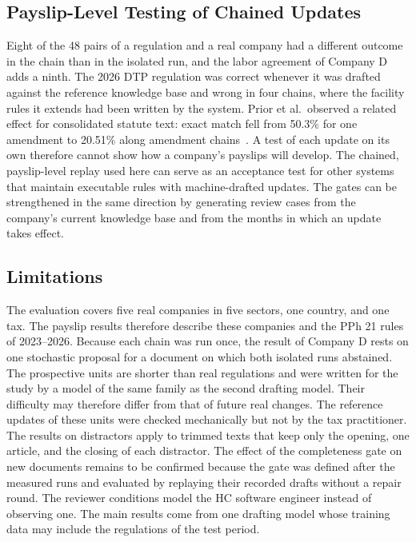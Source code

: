 \subsection{Payslip-Level Testing of Chained Updates}
Eight of the 48 pairs of a regulation and a real company had a different outcome in the chain than in the isolated run, and the labor agreement of Company D adds a ninth. The 2026 DTP regulation was correct whenever it was drafted against the reference knowledge base and wrong in four chains, where the facility rules it extends had been written by the system. Prior et al.\ observed a related effect for consolidated statute text: exact match fell from 50.3\% for one amendment to 20.51\% along amendment chains~\cite{prior2025risks}. A test of each update on its own therefore cannot show how a company's payslips will develop. The chained, payslip-level replay used here can serve as an acceptance test for other systems that maintain executable rules with machine-drafted updates. The gates can be strengthened in the same direction by generating review cases from the company's current knowledge base and from the months in which an update takes effect.

\subsection{Limitations}
The evaluation covers five real companies in five sectors, one country, and one tax. The payslip results therefore describe these companies and the PPh 21 rules of 2023--2026. Because each chain was run once, the result of Company D rests on one stochastic proposal for a document on which both isolated runs abstained. The prospective units are shorter than real regulations and were written for the study by a model of the same family as the second drafting model. Their difficulty may therefore differ from that of future real changes. The reference updates of these units were checked mechanically but not by the tax practitioner. The results on distractors apply to trimmed texts that keep only the opening, one article, and the closing of each distractor. The effect of the completeness gate on new documents remains to be confirmed because the gate was defined after the measured runs and evaluated by replaying their recorded drafts without a repair round. The reviewer conditions model the HC software engineer instead of observing one. The main results come from one drafting model whose training data may include the regulations of the test period.
